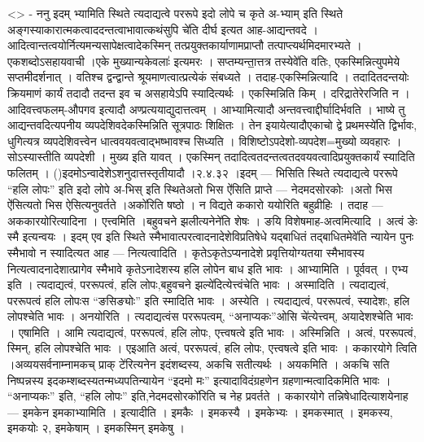 \textless{}\textgreater{} - ननु इदम् भ्यामिति स्थिते त्यदाद्यत्वे पररूपे
इदो लोपे च कृते अ-भ्याम् इति स्थिते
अङ्गस्याकारात्मकत्वाददन्तत्वाभावात्कथंसुपि चे॑ति दीर्घ इत्यत
आह-आद्यन्तवदे । आदित्वान्तत्वयोर्नित्यमन्यसापेक्षत्वादेकस्मिन्
तत्प्रयुक्तकार्याणामप्राप्तौ तत्पाप्त्यर्थमिदमारभ्यते ।एकशब्दोऽसहायवाची
।एके मुख्यान्यकेवलाः॑ इत्यमरः । सप्तम्यन्ता॒त्तत्र तस्येवे॑ति वतिः,
एकस्मिन्नित्युपमेये सप्तमीदर्शनात् । वतिश्च द्वन्द्वान्ते
श्रूयमाणत्वात्प्रत्येकं संबध्यते । तदाह-एकस्मिन्नित्यादि । तदादितदन्तयोः
क्रियमाणं कार्यं तदादौ तदन्त इव च असहायेऽपि स्यादित्यर्थः । एकस्मिन्निति
किम् । दरिद्रातेरेरजिति न । आदिवत्त्वफलम्-औपगव इत्यादौ
अण्प्रत्ययाद्युदात्तत्वम् । आभ्यामित्यादौ अन्तवत्त्वाद्दीर्घादिर्भवति ।
भाष्ये तु आद्यन्तवदित्यपनीय व्यपदेशिवदेकस्मिन्निति सूत्रपाठः शिक्षितः ।
तेन इयायेत्यादौएकाचो द्वे प्रथमस्ये॑ति द्विर्भावः, धुगित्यत्र
व्यपदेशिवत्त्वेन धात्ववयवत्वाद्भष्भावश्च सिध्यति ।
विशिष्टोऽपदेशो-व्यपदेश=मुख्यो व्यवहारः । सोऽस्यास्तीति व्यपदेशी । मुख्य
इति यावत् । एकस्मिन् तदादित्वतदन्तत्वतदवयवत्वादिप्रयुक्तकार्यं स्यादिति
फलितम् । ()इदमोऽन्वादेशेऽशनुदात्तस्तृतीयादौ ।२.४.३२ ।इदम् --- भिसिति
स्थिते त्यदाद्यत्वे पररूपे ``हलि लोपः'' इति इदो लोपे अ-भिस् इति
स्थितेअतो भिस ऐ॑सिति प्राप्ते --- नेदमदसोरकोः ।अतो भिस ऐ॑सित्यतो भिस
ऐसित्यनुवर्तते ।अको॑रिति षष्ठो । न विद्यते ककारो ययोरिति बहुव्रीहिः ।
तदाह --- अककारयोरित्यादिना । एत्त्वमिति ।बहुवचने झलीत्यनेने॑ति शेषः ।
ङयि विशेषमाह-अत्वमित्यादि । अत्वं ङेः स्मै इत्यन्वयः । इदम् एव इति
स्थिते स्मैभावात्परत्वादनादेशेविप्रतिषेधे यद्बाधितं तद्बाधितमेवे॑ति
न्यायेन पुनः स्मैभावो न स्यादित्यत आह --- नित्यत्वादिति ।
कृतेऽकृतेऽप्यनादेशे प्रवृत्तियोग्यतया स्मैभावस्य
नित्यत्वादनादेशात्प्रागेव स्मैभावे कृतेऽनादेशस्य हलि लोपेन बाध इति भावः
। आभ्यामिति । पूर्ववत् । एभ्य इति । त्यदाद्यत्वं, पररूपत्वं, हलि
लोपः,बहुवचने झल्ये॑दित्येत्त्वंचेति भावः । अस्मादिति । त्यदाद्यत्वं,
पररूपत्वं हलि लोपःस ``ङसिङ्योः'' इति स्मादिति भावः । अस्येति ।
त्यदाद्यत्वं, पररूपत्वं, स्यादेशः, हलि लोपश्चेति भावः । अनयोरिति ।
त्यदाद्यत्वंस पररूपत्वम्, ``अनाप्यकः''ओसि चे॑त्येत्त्वम्, अयादेशश्चेति
भावः । एषामिति । आमि त्यदाद्यत्वं, पररूपत्वं, हलि लोपः, एत्त्वषत्वे इति
भावः । अस्मिन्निति । अत्वं, पररूपत्वं, स्मिन्, हलि लोपश्चेति भावः ।
एइआति अत्वं, पररूपत्वं, हलि लोपः, एत्त्वषत्वे इति भावः । ककारयोगे त्विति
।अव्ययसर्वनाम्नामकच् प्राक् टे॑रित्यनेन इदंशब्दस्य, अकचि सतीत्यर्थः ।
अयकमिति । अकचि सति निष्पन्नस्य इदकम्शब्दस्यतन्मध्यपतिन्यायेन ``इदमो मः''
इत्यादाविदंग्रहणेन ग्रहणान्मत्वादिकमिति भावः । ``अनाप्यकः'' इति, ``हलि
लोपः'' इति,नेदमदसोरको॑रिति च नेह प्रवर्तते । ककारयोगे
तन्निषेधादित्याशयेनाह --- इमकेन इमकाभ्यामिति । इत्यादीति । इमकैः ।
इमकस्यै । इमकेभ्यः । इमकस्मात् । इमकस्य, इमकयोः २, इमकेषाम् । इमकस्मिन्
इमकेषु ।

